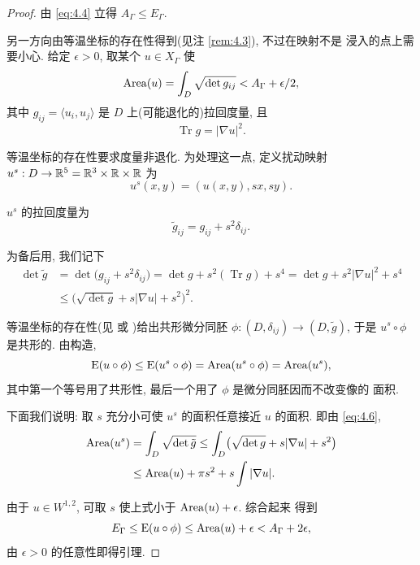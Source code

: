 \begin{proof}
由 \eqref{eq:4.4} 立得 $A_\Gamma\leq E_\Gamma$.

另一方向由等温坐标的存在性得到(见注 \ref{rem:4.3}), 不过在映射不是
浸入的点上需要小心. 给定 $\epsilon>0$, 取某个 $u\in X_\Gamma$ 使
\begin{equation*}
\operatorname{Area}(u)=\int_D\sqrt{\det g_{ij}}<A_\Gamma+\epsilon/2,
\end{equation*}
其中 $g_{ij}=\langle u_i,u_j\rangle$ 是 $D$ 上(可能退化的)拉回度量, 且
\begin{equation*}
\operatorname{Tr}g=|\nabla u|^2.
\end{equation*}

等温坐标的存在性要求度量非退化. 为处理这一点, 定义扰动映射
$u^s:D\to\mathbb{R}^5=\mathbb{R}^3\times\mathbb{R}\times\mathbb{R}$ 为
\begin{equation*}
u^s(x,y)=(u(x,y),sx,sy).
\end{equation*}

$u^s$ 的拉回度量为
\begin{equation*}
\tilde{g}_{ij}=g_{ij}+s^2\delta_{ij}.
\end{equation*}

为备后用, 我们记下
\begin{equation}
\begin{aligned}
\det\tilde{g}&=\det\bigl(g_{ij}+s^2\delta_{ij}\bigr)
 =\det g+s^2(\operatorname{Tr}g)+s^4=\det g+s^2|\nabla u|^2+s^4\\
&\leq\bigl(\sqrt{\det g}+s|\nabla u|+s^2\bigr)^2.
\end{aligned}
\label{eq:4.6}
\end{equation}

等温坐标的存在性(见 \cite{Mo2} 或 \cite{Ch2})给出共形微分同胚
$\phi:(D,\delta_{ij})\to(D,\tilde{g})$, 于是 $u^s\circ\phi$ 是共形的.
由构造,
\begin{equation*}
\mathrm{E}(u\circ\phi)\leq\mathrm{E}(u^s\circ\phi)
 =\operatorname{Area}(u^s\circ\phi)=\operatorname{Area}(u^s),
\end{equation*}
其中第一个等号用了共形性, 最后一个用了 $\phi$ 是微分同胚因而不改变像的
面积.

下面我们说明: 取 $s$ 充分小可使 $u^s$ 的面积任意接近 $u$ 的面积. 即由
\eqref{eq:4.6},
\begin{equation*}
\begin{aligned}
\operatorname{Area}(u^s)&=\int_D\sqrt{\det\tilde{g}}
 \leq\int_D\bigl(\sqrt{\det g}+s|\nabla u|+s^2\bigr)\\
&\leq\operatorname{Area}(u)+\pi s^2+s\int|\nabla u|.
\end{aligned}
\end{equation*}

由于 $u\in W^{1,2}$, 可取 $s$ 使上式小于 $\operatorname{Area}(u)+\epsilon$. 综合起来
得到
\begin{equation*}
E_\Gamma\leq\mathrm{E}(u\circ\phi)\leq\operatorname{Area}(u)+\epsilon<A_\Gamma+2\epsilon,
\end{equation*}
由 $\epsilon>0$ 的任意性即得引理.
\end{proof}

